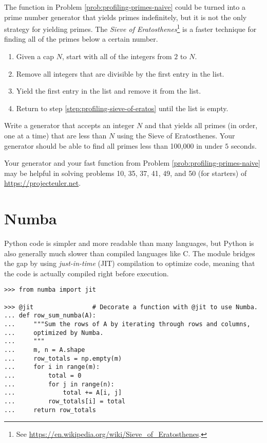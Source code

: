 \begin{problem} %
The function in Problem \ref{prob:profiling-primes-naive} could be turned into a prime number generator that yields primes indefinitely, but it is not the only strategy for yielding primes.
The \emph{Sieve of Eratosthenes}\footnote{See \url{https://en.wikipedia.org/wiki/Sieve_of_Eratosthenes}.} is a faster technique for finding all of the primes below a certain number.
\begin{enumerate}
\item Given a cap $N$, start with all of the integers from $2$ to $N$.
\item Remove all integers that are divisible by the first entry in the list. \label{step:profiling-sieve-of-eratos}
\item Yield the first entry in the list and remove it from the list.
\item Return to step \ref{step:profiling-sieve-of-eratos} until the list is empty.
\end{enumerate}

Write a generator that accepts an integer $N$ and that yields all primes (in order, one at a time) that are less than $N$ using the Sieve of Eratosthenes.
Your generator should be able to find all primes less than 100,000 in under $5$ seconds.

Your generator and your fast function from Problem \ref{prob:profiling-primes-naive} may be helpful in solving problems 10, 35, 37, 41, 49, and 50 (for starters) of \url{https://projecteuler.net}.
\end{problem}

\section*{Numba} %

Python code is simpler and more readable than many languages, but Python is also generally much slower than compiled languages like C.
The  module
bridges the gap by using \emph{just-in-time} (JIT) compilation to optimize code, meaning that the code is actually compiled right before execution.

\begin{lstlisting}
>>> from numba import jit

>>> @jit                # Decorate a function with @jit to use Numba.
... def row_sum_numba(A):
...     """Sum the rows of A by iterating through rows and columns,
...     optimized by Numba.
...     """
...     m, n = A.shape
...     row_totals = np.empty(m)
...     for i in range(m):
...         total = 0
...         for j in range(n):
...             total += A[i, j]
...         row_totals[i] = total
...     return row_totals
\end{lstlisting}

